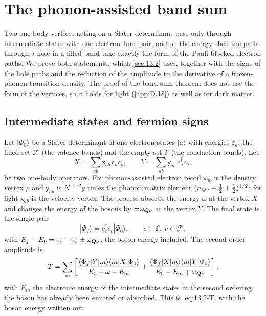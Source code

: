 \section{The phonon-assisted band sum}\label{app:D.35}

Two one-body vertices acting on a Slater determinant pass only through intermediate states with one electron--hole pair, and on the energy shell the paths through a hole in a filled band take exactly the form of the Pauli-blocked electron paths. We prove both statements, which \cref{sec:13.2} uses, together with the signs of the hole paths and the reduction of the amplitude to the derivative of a frozen-phonon transition density. The proof of the band-sum theorem does not use the form of the vertices, so it holds for light (\cref{app:D.18}) as well as for dark matter.

\subsection*{Intermediate states and fermion signs}

Let $|\Phi_0\rangle$ be a Slater determinant of one-electron states $|a\rangle$ with energies $\varepsilon_a$: the filled set $\mathcal{F}$ (the valence bands) and the empty set $\mathcal{E}$ (the conduction bands). Let
\begin{equation*}
  X = \sum_{ab}\mathsf{x}_{ab}\,c^\dagger_ac_b , \qquad Y = \sum_{ab}\mathsf{y}_{ab}\,c^\dagger_ac_b ,
\end{equation*}
be two one-body operators. For phonon-assisted electron recoil $\mathsf{x}_{ab}$ is the density vertex $\rho$ and $\mathsf{y}_{ab}$ is $N^{-1/2}g$ times the phonon matrix element $(n_{\bm{Q}\nu} + \frac12 \pm \frac12)^{1/2}$; for light $\mathsf{x}_{ab}$ is the velocity vertex. The process absorbs the energy $\omega$ at the vertex $X$ and changes the energy of the bosons by $\pm\omega_{\bm{Q}\nu}$ at the vertex $Y$. The final state is the single pair
\begin{equation*}
  |\Phi_f\rangle = c^\dagger_cc_v|\Phi_0\rangle , \qquad c\in\mathcal{E},\ v\in\mathcal{F},
\end{equation*}
with $E_f - E_0 = \varepsilon_c - \varepsilon_v \pm \omega_{\bm{Q}\nu}$, the boson energy included. The second-order amplitude is
\begin{equation}
  T = \sum_m\left[\frac{\langle\Phi_f|Y|m\rangle\langle m|X|\Phi_0\rangle}{E_0 + \omega - E_m} + \frac{\langle\Phi_f|X|m\rangle\langle m|Y|\Phi_0\rangle}{E_0 - E_m \mp \omega_{\bm{Q}\nu}}\right] ,
  \label{eq:D.35-T}
\end{equation}
with $E_m$ the electronic energy of the intermediate state; in the second ordering the boson has already been emitted or absorbed. This is \cref{eq:13.2-T} with the boson energy written out.

